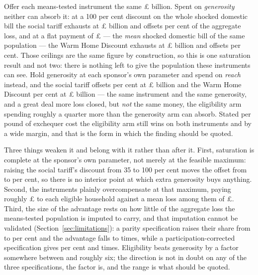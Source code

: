 Offer each means-tested instrument the same \pounds \genEnvelopeBn{} billion. Spent on \emph{generosity} neither can absorb it: at a 100 per cent discount on the whole shocked domestic bill the social tariff exhausts at \pounds \genSocialTariffAbsorbableBn{} billion and offsets \genSocialTariffEnvelopeOffsetPct{} per cent of the aggregate loss, and at a flat payment of \pounds \genWhdFeasibleMaxParameterGbp{} --- the \emph{mean} shocked domestic bill of the same population --- the Warm Home Discount exhausts at \pounds \genWhdAbsorbableBn{} billion and offsets \genWhdEnvelopeOffsetPct{} per cent. Those ceilings are the same figure by construction, so this is one saturation result and not two: there is nothing left to give the population these instruments can see. Hold generosity at each sponsor's own parameter and spend on \emph{reach} instead, and the social tariff offsets \genSocialTariffEligibilityOffsetPct{} per cent at \pounds \genSocialTariffEligibilityCostBn{} billion and the Warm Home Discount \genWhdEligibilityOffsetPct{} per cent at \pounds \genWhdEligibilityCostBn{} billion --- the same instrument and the same generosity, and a great deal more loss closed, but \emph{not} the same money, the eligibility arm spending roughly a quarter more than the generosity arm can absorb. Stated per pound of exchequer cost the eligibility arm still wins on both instruments and by a wide margin, and that is the form in which the finding should be quoted.

Three things weaken it and belong with it rather than after it. First, saturation is complete at the sponsor's own parameter, not merely at the feasible maximum: raising the social tariff's discount from 35 to 100 per cent moves the offset from \genSocialTariffStatedOffsetPct{} to \genSocialTariffCappedOffsetPct{} per cent, so there is no interior point at which extra generosity buys anything. Second, the instruments plainly overcompensate at that maximum, paying roughly \pounds \genSocialTariffCappedGainPerEligibleGbp{} to each eligible household against a mean loss among them of \pounds \genMeansTestedMeanLossGbp{}. Third, the size of the advantage rests on how little of the aggregate loss the means-tested population is imputed to carry, and that imputation cannot be validated (Section~\ref{sec:limitations}): a parity specification raises their share from \genMeansTestedShareOfLossPct{} to \genMeansTestedShareOfLossParityPct{} per cent and the advantage falls to \genTargetingMultipleUnderParity{} times, while a participation-corrected specification gives \genMeansTestedShareOfLossParticipationPct{} per cent and \genTargetingMultipleUnderParticipation{} times. Eligibility beats generosity by a factor somewhere between \genTargetingMultipleUnderParity{} and roughly six; the direction is not in doubt on any of the three specifications, the factor is, and the range is what should be quoted.

